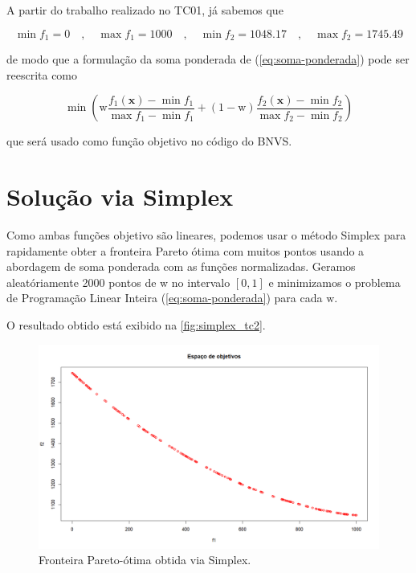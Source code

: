 \documentclass[
	12pt,				%
	oneside,			%
	a4paper,			%
	chapter=TITLE,
	sumario=tradicional,
	english,			%
	brazil				%
]{abntex2}
\begin{document}
A partir do trabalho realizado no TC01, já sabemos que 

\[ 
\min f_1 = 0 \quad , \quad 
\max f_1 = 1000 \quad , \quad 
\min f_2 = 1048.17 \quad , \quad 
\max f_2 = 1745.49 
\]

\noindent de modo que a formulação da soma ponderada de (\ref{eq:soma-ponderada})
pode ser reescrita como  

\[ \min \left( \mathrm{w}\frac{f_1(\mathbf{x}) - \min f_1}{\max f_1 - \min f_1} 
+ (1-\mathrm{w})\frac{f_2(\mathbf{x}) - \min f_2}{\max f_2 - \min f_2}\right)    \]   


\noindent que será usado como função objetivo no código do BNVS.

\chapter{Solução via Simplex}\label{cap:simplex} 

Como ambas funções objetivo são lineares, podemos usar o método Simplex 
para rapidamente obter a fronteira Pareto ótima com muitos pontos usando 
a abordagem de soma ponderada com as funções normalizadas. 
Geramos aleatóriamente 2000 pontos de $\mathrm{w}$ no intervalo $[0, 1]$ e 
minimizamos o problema de Programação Linear Inteira (\ref{eq:soma-ponderada})
para cada $\mathrm{w}$.

O resultado obtido está exibido na \autoref{fig:simplex_tc2}.

\begin{figure}[h!]
	\caption{\label{fig:simplex_tc2}Fronteira Pareto-ótima obtida via Simplex.}
	\begin{center}
    \includegraphics[width=\textwidth,trim=1 1 1 1,clip]{simplex_tc2.png}
	\end{center}
\end{figure}
\end{document}
